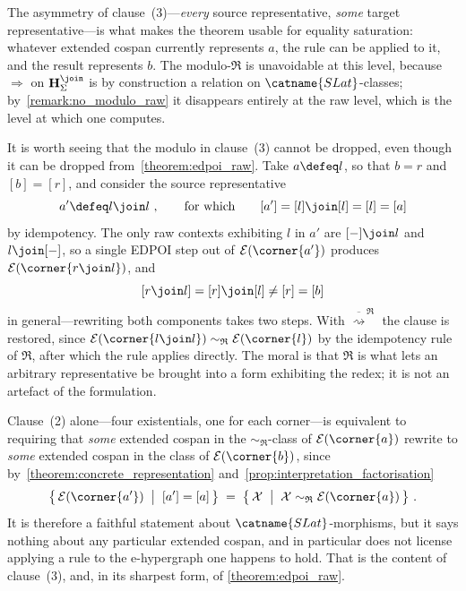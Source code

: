 \begin{remark}
The asymmetry of clause~(3)---\emph{every} source representative, \emph{some} target
representative---is what makes the theorem usable for equality saturation: whatever
extended cospan currently represents $a$, the rule can be applied to it, and the result
represents $b$.
The modulo-$\mathfrak{R}$ is unavoidable at this level, because $\Rightarrow$ on
$\mathbf{H}^{\join}_{\Sigma}$ is by construction a relation on $\catname{SLat}$-classes;
by~\cref{remark:no_modulo_raw} it disappears entirely at the raw level, which is the
level at which one computes.
\end{remark}

\begin{remark}\label{remark:clause3_needs_modulo}
It is worth seeing that the modulo in clause~(3) cannot be dropped, even though it can be
dropped from~\cref{theorem:edpoi_raw}.
Take $a \defeq l$, so that $b = r$ and $[b] = [r]$, and consider the source
representative
\[
a' \defeq l \join l~, \qquad\text{for which}\qquad [a'] = [l] \join [l] = [l] = [a]
\]
by idempotency.
The only raw contexts exhibiting $l$ in $a'$ are $[-] \join l$ and $l \join [-]$, so a
single EDPOI step out of $\mathcal{E}(\corner{a'})$ produces
$\mathcal{E}(\corner{r \join l})$, and
\[
[r \join l] = [r] \join [l] \neq [r] = [b]
\]
in general---rewriting both components takes two steps.
With $\overline{\rightsquigarrow}^{\,\mathfrak{R}}$ the clause is restored, since
$\mathcal{E}(\corner{l \join l}) \sim_{\mathfrak{R}} \mathcal{E}(\corner{l})$ by the
idempotency rule of $\mathfrak{R}$, after which the rule applies directly.
The moral is that $\mathfrak{R}$ is what lets an arbitrary representative be brought into
a form exhibiting the redex; it is not an artefact of the formulation.
\end{remark}

\begin{remark}\label{remark:existential_form}
Clause~(2) alone---four existentials, one for each corner---is equivalent to requiring
that \emph{some} extended cospan in the $\sim_{\mathfrak{R}}$-class of
$\mathcal{E}(\corner{a})$ rewrite to \emph{some} extended cospan in the class of
$\mathcal{E}(\corner{b})$, since by~\cref{theorem:concrete_representation}
and~\cref{prop:interpretation_factorisation}
\[
\bigl\{\, \mathcal{E}(\corner{a'}) \;\bigm|\; [a'] = [a] \,\bigr\}
\;=\;
\bigl\{\, \mathcal{X} \;\bigm|\; \mathcal{X} \sim_{\mathfrak{R}} \mathcal{E}(\corner{a}) \,\bigr\}~.
\]
It is therefore a faithful statement about $\catname{SLat}$-morphisms, but it says nothing
about any particular extended cospan, and in particular does not license applying a rule
to the e-hypergraph one happens to hold.
That is the content of clause~(3), and, in its sharpest form, of
\cref{theorem:edpoi_raw}.
\end{remark}

